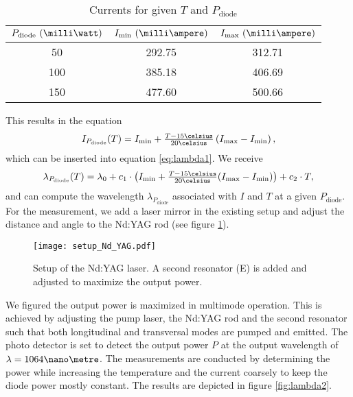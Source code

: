 \begin{table}[h]
	\centering
	\caption{Currents for given $T$ and $P_\text{diode}$}
	\begin{tabular}{c @{\qquad} c c}
	\toprule
	$P_\text{diode}~(\milli\watt)$ & $I_\text{min}~(\milli\ampere)$ & $I_\text{max}~(\milli\ampere)$\\
	\midrule
	50 & 292.75 & 312.71\\
	100 & 385.18 & 406.69\\
	150 & 477.60 & 500.66\\
	\bottomrule
	\end{tabular}
	\label{tab:current_P}
\end{table}

This results in the equation
\begin{align}
I_{P_\text{diode}}(T)=I_\text{min}+\tfrac{T-15\celsius}{20\celsius}\left(I_\text{max}-I_\text{min}\right),
\label{eq:current_P}
\end{align}
which can be inserted into equation \eqref{eq:lambda1}. We receive
\begin{align}
\lambda_{P_\text{diode}}(T)=\lambda_0+c_1\cdot \left(I_\text{min}+\tfrac{T-15\celsius}{20\celsius}(I_\text{max}-I_\text{min})\right)+c_2\cdot T,
\label{eq:lambda2}
\end{align}
and can compute the wavelength $\lambda_{P_\text{diode}}$ associated with $I$ and $T$ at a given $P_\text{diode}$.
For the measurement, we add a laser mirror in the existing setup and adjust the distance and angle to the Nd:YAG rod (see figure \ref{fig:setup_Nd:YAG}).

\begin{figure}[p]
	\centering
	\texttt{[image: setup\_Nd\_YAG.pdf]}
	\caption[Setup of the Nd:YAG laser]{Setup of the Nd:YAG laser. A second resonator (E) is added and adjusted to maximize the output power. \cite{lit:manual}}
	\label{fig:setup_Nd:YAG}
\end{figure}

We figured the output power is maximized in multimode operation. This is achieved by adjusting the pump laser, the Nd:YAG rod and the second resonator such that both longitudinal and transversal modes are pumped and emitted.
The photo detector is set to detect the output power $P$ at the output wavelength of $\lambda=1064\nano\metre$. The measurements are conducted by determining the power while increasing the temperature and the current coarsely to keep the diode power mostly constant.
The results are depicted in figure \ref{fig:lambda2}.

